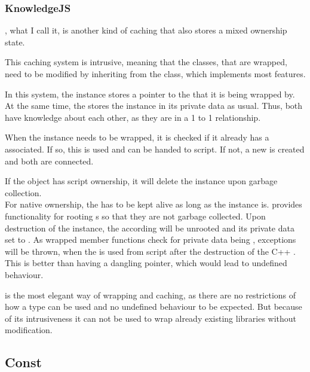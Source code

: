 \subsubsection{KnowledgeJS}

, what I call it, is another kind of caching that also stores a mixed ownership state.

This caching system is intrusive, meaning that the  classes, that are wrapped, need to be modified by inheriting from the  class, which implements most features.

In this system, the  instance stores a pointer to the  that it is being wrapped by. At the same time, the  stores the  instance in its private data as usual. Thus, both have knowledge about each other, as they are in a 1 to 1 relationship.

When the  instance needs to be wrapped, it is checked if it already has a  associated. If so, this  is used and can be handed to script. If not, a new  is created and both are connected.

If the object has script ownership, it will delete the  instance upon garbage collection.\\
For native ownership, the  has to be kept alive as long as the  instance is.  provides functionality for rooting s so that they are not garbage collected. Upon destruction of the  instance, the according  will be unrooted and its private data set to . As wrapped member functions check for private data being ,  exceptions will be thrown, when the  is used from script after the destruction of the C++ . This is better than having a dangling pointer, which would lead to undefined behaviour.

 is the most elegant way of wrapping and caching, as there are no restrictions of how a type can be used and no undefined behaviour to be expected. But because of its intrusiveness it can not be used to wrap already existing libraries without modification.

\subsection{Const}

